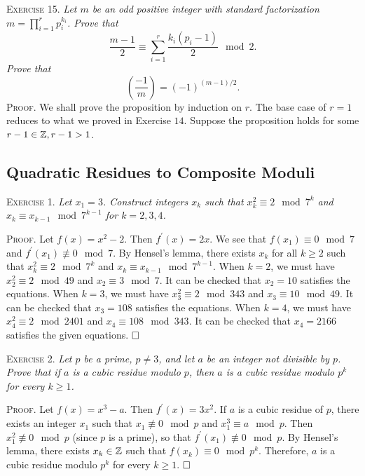 \documentclass[11pt, leqno]{article}
\newcommand{\done}{\ensuremath{\hfill\square}}
\begin{document}
\textsc{Exercise 15}. \emph{Let $m$ be an odd positive integer with standard factorization $m = \prod_{i=1}^r p_i^{k_i}$. Prove that 
\begin{displaymath}
\frac{m-1}{2} \equiv \sum_{i=1}^r \frac{k_i(p_i-1)}{2} \mod 2.
\end{displaymath}Prove that 
\begin{displaymath}
\left( \frac{-1}{m} \right) = (-1)^{(m-1)/2}.
\end{displaymath}}\textsc{Proof}. We shall prove the proposition by induction on $r$. The base case of $r=1$ reduces to what we proved in Exercise $14$. Suppose the proposition holds for some $r-1\in \mathbb{Z}, r-1>1$.

\subsection{Quadratic Residues to Composite Moduli}

\textsc{Exercise 1}. \emph{Let $x_1 = 3$. Construct integers $x_k$ such that $x_k^2 \equiv 2 \mod 7^k$ and $x_k \equiv x_{k-1} \mod 7^{k-1}$ for $k=2,3,4$.}

\textsc{Proof}. Let $f(x) = x^2-2$. Then $f^{\prime}(x) = 2x$. We see that $f(x_1) \equiv 0 \mod 7$ and $f^{\prime}(x_1) \not\equiv 0 \mod 7$. By Hensel's lemma, there exists $x_k$ for all $k\geq 2$ such that $x_k^2 \equiv 2 \mod 7^k$ and $x_k \equiv x_{k-1} \mod 7^{k-1}$. When $k=2$, we must have $x_2^2 \equiv 2 \mod 49$ and $x_2 \equiv 3 \mod 7$. It can be checked that $x_2=10$ satisfies the equations. When $k=3$, we must have $x_3^2 \equiv 2 \mod 343$ and $x_3 \equiv 10 \mod 49$. It can be checked that $x_3 = 108$ satisfies the equations. When $k=4$, we must have $x_4^2 \equiv 2\mod 2401$ and $x_4 \equiv 108 \mod 343$. It can be checked that $x_4 = 2166$ satisfies the given equations. \done

\textsc{Exercise 2}. \emph{Let $p$ be a prime, $p\ne 3$, and let $a$ be an integer not divisible by $p$. Prove that if $a$ is a cubic residue modulo $p$, then $a$ is a cubic residue modulo $p^k$ for every $k \geq 1$.}

\textsc{Proof}. Let $f(x) = x^3 - a$. Then $f^{\prime}(x) = 3x^2$. If $a$ is a cubic residue of $p$, there exists an integer $x_1$ such that $x_1 \not \equiv 0 \mod p$ and $x_1^3 \equiv a \mod p$. Then $x_1^2 \not\equiv 0 \mod p$ (since $p$ is a prime), so that $f^{\prime}(x_1) \not\equiv 0 \mod p$. By Hensel's lemma, there exists $x_k \in \mathbb{Z}$ such that $f(x_k) \equiv 0 \mod p^k$. Therefore, $a$ is a cubic residue modulo $p^k$ for every $k\geq 1$. \done
\end{document}
